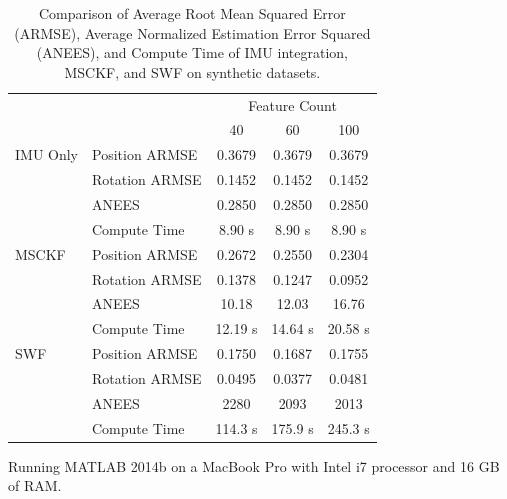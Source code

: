 \documentclass[letterpaper, 10 pt, conference]{ieeeconf}  %
\newcommand\T{\rule{0pt}{2.6ex}}        %
\newcommand\B{\rule[-1.2ex]{0pt}{0pt}} %
\begin{document}
\begin{table}
    \centering
    \caption{Comparison of Average Root Mean Squared Error (ARMSE), Average Normalized Estimation Error Squared (ANEES), and Compute Time of IMU integration, MSCKF, and SWF on synthetic datasets.}
    \begin{threeparttable}
    \begin{tabular}{llccc} 
                    &                   & \multicolumn{3}{c}{Feature Count} \B      \\ \cline{3-5}
                    &                   & 40        & 60        & 100       \T\B    \\ \hline
        IMU Only    & Position ARMSE    & 0.3679    & 0.3679    & 0.3679    \T      \\
                    & Rotation ARMSE    & 0.1452    & 0.1452    & 0.1452            \\
                    & ANEES             & 0.2850    & 0.2850    & 0.2850            \\
                    & Compute Time\tnote{\dag}      & 8.90 s    & 8.90 s    & 8.90 s    \B      \\ \hline
        MSCKF       & Position ARMSE    & 0.2672    & 0.2550    & 0.2304    \T      \\
                    & Rotation ARMSE    & 0.1378    & 0.1247    & 0.0952            \\
                    & ANEES             & 10.18     & 12.03     & 16.76             \\
                    & Compute Time\tnote{\dag}     & 12.19 s   & 14.64 s   & 20.58 s   \B      \\ \hline
        SWF         & Position ARMSE    & 0.1750    & 0.1687    & 0.1755    \T      \\
                    & Rotation ARMSE    & 0.0495    & 0.0377    & 0.0481            \\
                    & ANEES             & 2280      & 2093      & 2013              \\
                    & Compute Time\tnote{\dag}     & 114.3 s   & 175.9 s   & 245.3 s   \B      \\ \hline
    \end{tabular}
    \begin{tablenotes}
        \item [\dag] Running MATLAB 2014b on a MacBook Pro with Intel i7 processor and 16 GB of RAM.
    \end{tablenotes}
    \end{threeparttable}
    \label{tab:rmse_nees}
\end{table}
\end{document}
